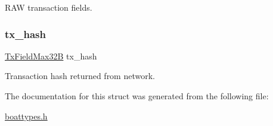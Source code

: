 R\+AW transaction fields. 

\mbox{\label{struct_t_tx_info_a9fa44cd0e482e25867a6521688eca3e0}} 
\subsubsection{\texorpdfstring{tx\+\_\+hash}{tx\_hash}}
{\footnotesize\ttfamily \mbox{\hyperlink{boattypes_8h_af8a3635bb5261915dff042bd32f3466b}{Tx\+Field\+Max32B}} tx\+\_\+hash}



Transaction hash returned from network. 



The documentation for this struct was generated from the following file\+:\begin{DoxyCompactItemize}
\item 
\mbox{\hyperlink{boattypes_8h}{boattypes.\+h}}\end{DoxyCompactItemize}
